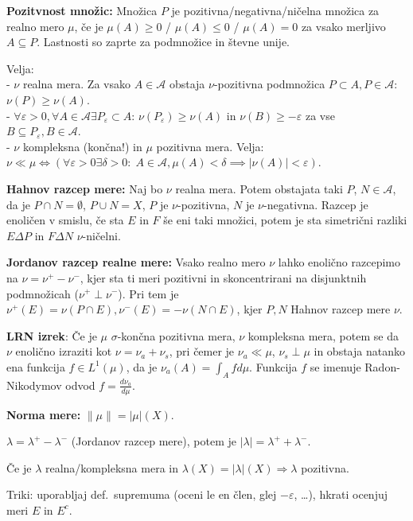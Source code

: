 \documentclass[a4paper,oneside,10pt]{article}
\theoremstyle{definition}
\newcommand{\A}{\ensuremath{\mathcal{A}}}
\begin{document}
\textbf{Pozitvnost množic:} Množica $P$ je pozitivna/negativna/ničelna množica za realno mero $\mu$,
če je $\mu(A) \geq 0$ / $\mu(A) \leq 0$ / $\mu(A) = 0$ za vsako merljivo $A \subseteq P$. Lastnosti so zaprte za podmnožice in števne unije.

Velja:\\
- $\nu$ realna mera. Za vsako $A \in \A$ obstaja $\nu$-pozitivna podmnožica $P \subset A, P \in \A$: $\nu(P) \geq \nu(A)$.\\
- $\forall \varepsilon > 0, \forall A \in \A \exists P_{\varepsilon} \subset A$: $\nu(P_{\varepsilon}) \geq \nu(A)$ in $\nu(B) \geq - \varepsilon$ za vse $B \subseteq P_{\varepsilon}, B \in \A$.\\
- $\nu$ kompleksna (končna!) in $\mu$ pozitivna mera. Velja: $\nu \ll \mu \iff (\forall \varepsilon > 0 \exists \delta > 0: \; A \in \A, \mu(A) < \delta \implies |\nu(A)|< \varepsilon)$.

\textbf{Hahnov razcep mere:} Naj bo $\nu$ realna mera. Potem obstajata taki $P$, $N \in \mathcal{A}$, da
je $P \cap N = \emptyset$, $P \cup N = X$, $P$ je $\nu$-pozitivna, $N$ je $\nu$-negativna.
Razcep je enoličen v smislu, če sta $E$ in $F$ še eni taki množici, potem je sta simetrični razliki
$E \Delta P$ in $F \Delta N$ $\nu$-ničelni.

\textbf{Jordanov razcep realne mere:} Vsako realno mero $\nu$ lahko enolično razcepimo na
$\nu = \nu^+ - \nu^-$, kjer sta ti meri pozitivni in skoncentrirani na disjunktnih podmnožicah
($\nu^+ \perp \nu^-$). Pri tem je $\nu^+(E) = \nu(P \cap E) , \nu^-(E) = - \nu(N \cap E)$, kjer $P, N$ Hahnov razcep mere $\nu$.

\textbf{LRN izrek}: Če je $\mu$ $\sigma$-končna pozitivna mera, $\nu$ kompleksna mera, potem se da
$\nu$ enolično izraziti kot $\nu = \nu_a + \nu_s$, pri čemer je $\nu_a \ll \mu$, $\nu_s \perp \mu$ in
obstaja natanko ena funkcija $f \in L^1(\mu)$, da je $\nu_a(A) = \int_A f d\mu$. Funkcija $f$ se imenuje
Radon-Nikodymov odvod $f = \frac{d\nu_a}{d\mu}$.

\textbf{Norma mere:} $\|\mu\| = |\mu|(X)$.

$\lambda = \lambda^{+} - \lambda^{-}$ (Jordanov razcep mere), potem
je $|\lambda| = \lambda^{+} + \lambda^{-}$.

Če je $\lambda$ realna/kompleksna mera in $\lambda(X) = |\lambda|(X) \Longrightarrow \lambda$ pozitivna.

Triki: uporabljaj def.\ supremuma (oceni le en člen, glej $-\varepsilon$, \ldots), hkrati ocenjuj meri $E$ in $E^c$.
\end{document}
